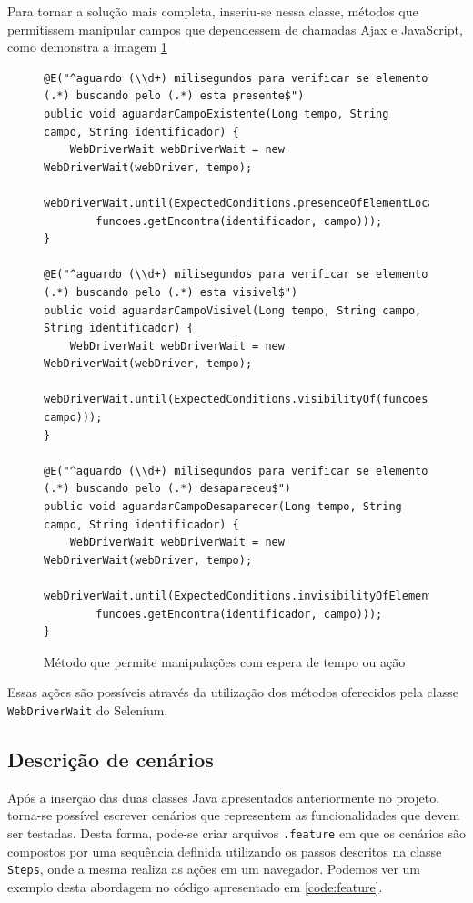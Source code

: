 \documentclass[tg]{mdtufsm}
\begin{document}
Para tornar a solução mais completa, inseriu-se nessa classe, métodos que permitissem manipular campos que dependessem de chamadas Ajax e JavaScript, como demonstra a imagem \ref{code:Método WebDriverWait}

\begin{figure}[!htt]
	\begin{lstlisting}
@E("^aguardo (\\d+) milisegundos para verificar se elemento (.*) buscando pelo (.*) esta presente$")
public void aguardarCampoExistente(Long tempo, String campo, String identificador) {
    WebDriverWait webDriverWait = new WebDriverWait(webDriver, tempo);
    webDriverWait.until(ExpectedConditions.presenceOfElementLocated(
        funcoes.getEncontra(identificador, campo)));
}

@E("^aguardo (\\d+) milisegundos para verificar se elemento (.*) buscando pelo (.*) esta visivel$")
public void aguardarCampoVisivel(Long tempo, String campo, String identificador) {
    WebDriverWait webDriverWait = new WebDriverWait(webDriver, tempo);
    webDriverWait.until(ExpectedConditions.visibilityOf(funcoes.getEncontraCampo(identificador, campo)));
}

@E("^aguardo (\\d+) milisegundos para verificar se elemento (.*) buscando pelo (.*) desapareceu$")
public void aguardarCampoDesaparecer(Long tempo, String campo, String identificador) {
    WebDriverWait webDriverWait = new WebDriverWait(webDriver, tempo);
    webDriverWait.until(ExpectedConditions.invisibilityOfElementLocated(
        funcoes.getEncontra(identificador, campo)));
}
	\end{lstlisting}
	\caption{Método que permite manipulações com espera de tempo ou ação}
	\label{code:Método WebDriverWait}
\end{figure}

Essas ações são possíveis através da utilização dos métodos oferecidos pela classe \texttt{WebDriverWait} do Selenium.

\subsection{Descrição de cenários}
Após a inserção das duas classes Java apresentados anteriormente no projeto, torna-se possível escrever cenários que representem as funcionalidades que devem ser testadas.
Desta forma, pode-se criar arquivos \texttt{.feature} em que os cenários são compostos por uma sequência definida utilizando os passos descritos na classe \texttt{Steps}, onde a mesma realiza as ações em um navegador.
Podemos ver um exemplo desta abordagem no código apresentado em \ref{code:feature}.
\end{document}
